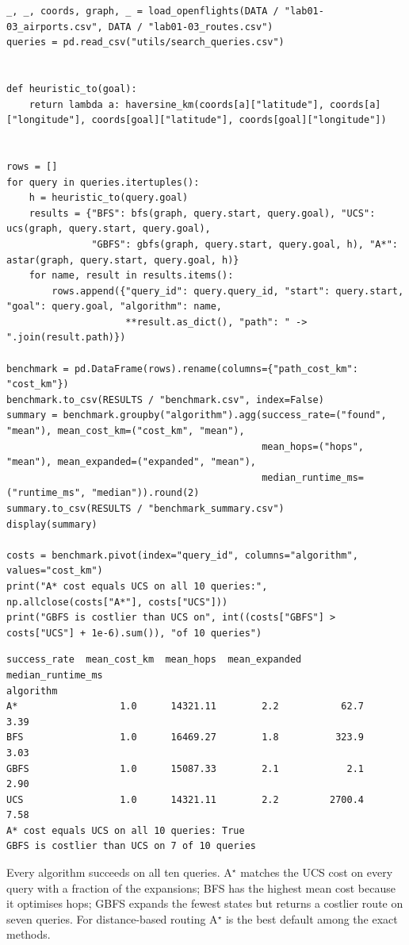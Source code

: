 \begin{labanswer}
\begin{lstlisting}[style=utppython]
_, _, coords, graph, _ = load_openflights(DATA / "lab01-03_airports.csv", DATA / "lab01-03_routes.csv")
queries = pd.read_csv("utils/search_queries.csv")


def heuristic_to(goal):
    return lambda a: haversine_km(coords[a]["latitude"], coords[a]["longitude"], coords[goal]["latitude"], coords[goal]["longitude"])


rows = []
for query in queries.itertuples():
    h = heuristic_to(query.goal)
    results = {"BFS": bfs(graph, query.start, query.goal), "UCS": ucs(graph, query.start, query.goal),
               "GBFS": gbfs(graph, query.start, query.goal, h), "A*": astar(graph, query.start, query.goal, h)}
    for name, result in results.items():
        rows.append({"query_id": query.query_id, "start": query.start, "goal": query.goal, "algorithm": name,
                     **result.as_dict(), "path": " -> ".join(result.path)})

benchmark = pd.DataFrame(rows).rename(columns={"path_cost_km": "cost_km"})
benchmark.to_csv(RESULTS / "benchmark.csv", index=False)
summary = benchmark.groupby("algorithm").agg(success_rate=("found", "mean"), mean_cost_km=("cost_km", "mean"),
                                             mean_hops=("hops", "mean"), mean_expanded=("expanded", "mean"),
                                             median_runtime_ms=("runtime_ms", "median")).round(2)
summary.to_csv(RESULTS / "benchmark_summary.csv")
display(summary)

costs = benchmark.pivot(index="query_id", columns="algorithm", values="cost_km")
print("A* cost equals UCS on all 10 queries:", np.allclose(costs["A*"], costs["UCS"]))
print("GBFS is costlier than UCS on", int((costs["GBFS"] > costs["UCS"] + 1e-6).sum()), "of 10 queries")
\end{lstlisting}
\expectedoutput
\begin{lstlisting}[style=utpterminal]
           success_rate  mean_cost_km  mean_hops  mean_expanded  median_runtime_ms
algorithm
A*                  1.0      14321.11        2.2           62.7               3.39
BFS                 1.0      16469.27        1.8          323.9               3.03
GBFS                1.0      15087.33        2.1            2.1               2.90
UCS                 1.0      14321.11        2.2         2700.4               7.58
A* cost equals UCS on all 10 queries: True
GBFS is costlier than UCS on 7 of 10 queries
\end{lstlisting}
Every algorithm succeeds on all ten queries. A$^\star$ matches the UCS cost on every query with a fraction of the expansions; BFS has the highest mean cost because it optimises hops; GBFS expands the fewest states but returns a costlier route on seven queries. For distance-based routing A$^\star$ is the best default among the exact methods.
\end{labanswer}

